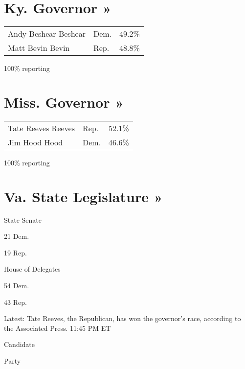 \href{https://www.nytimes3xbfgragh.onion/interactive/2019/11/05/us/elections/results-kentucky-governor-general-election.html}{}

\hypertarget{ky-governor-}{%
\section{Ky. Governor »}\label{ky-governor-}}

\begin{longtable}[]{@{}lll@{}}
\toprule
\endhead
 Andy Beshear Beshear & Dem. & 49.2\%\tabularnewline
 Matt Bevin Bevin & Rep. & 48.8\%\tabularnewline
\bottomrule
\end{longtable}

100\% reporting

\href{https://www.nytimes3xbfgragh.onion/interactive/2019/11/05/us/elections/results-mississippi-governor-general-election.html}{}

\hypertarget{miss-governor-}{%
\section{Miss. Governor »}\label{miss-governor-}}

\begin{longtable}[]{@{}lll@{}}
\toprule
\endhead
 Tate Reeves Reeves & Rep. & 52.1\%\tabularnewline
 Jim Hood Hood & Dem. & 46.6\%\tabularnewline
\bottomrule
\end{longtable}

100\% reporting

\href{https://www.nytimes3xbfgragh.onion/interactive/2019/11/05/us/elections/results-virginia-general-elections.html}{}

\hypertarget{va-state-legislature-}{%
\section{Va. State Legislature »}\label{va-state-legislature-}}

State Senate

21 Dem.

19 Rep.

House of Delegates

54 Dem.

43 Rep.

Latest: Tate Reeves, the Republican, has won the governor's race,
according to the Associated Press. 11:45 PM ET

Candidate

Party

